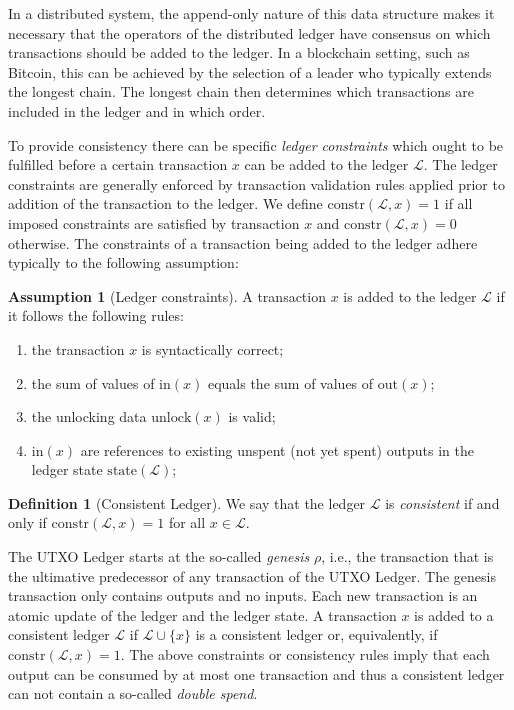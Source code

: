 \documentclass[11pt]{article}
\newcommand{\orig}{\rho}
\newcommand{\unlock}{\mathrm{unlock}}
\newcommand{\constraint}{\mathrm{constr}}
\newcommand{\state}{\mathrm{state}}
\newcommand{\true}{1}
\newcommand{\false}{0}
\newcommand{\inputs}{\mathrm{in}}
\newcommand{\outputs}{\mathrm{out}}
\newcommand{\ledger}{\mathcal{L}}
\theoremstyle{plain}
\theoremstyle{definition}
\newtheorem{definition}{Definition}
\newtheorem{ass}{Assumption}
\numberwithin{definition}{section}
\numberwithin{lemma}{section}
\numberwithin{ass}{section}
\numberwithin{remark}{section}
\numberwithin{example}{section}
\numberwithin{proposition}{section}
\numberwithin{theorem}{section}
\begin{document}
In a distributed system, the append-only nature of this data structure makes it necessary that the operators of the distributed ledger have consensus on which transactions should be added to the ledger. In a blockchain setting, such as Bitcoin, this can be achieved by the selection of a leader who typically extends the longest chain. The longest chain then determines which transactions  are included in the ledger and in which order. 

To provide consistency there can be specific \emph{ledger constraints} which ought to be fulfilled before a certain  transaction $x$ can be added to the ledger $\ledger$. The ledger constraints are generally enforced by transaction validation rules applied prior to addition of the transaction to the ledger. We define $\constraint(\ledger,x)=\true$ if all imposed constraints are satisfied by transaction $x$ and $\constraint(\ledger,x)=\false$ otherwise. 
The constraints of a transaction being added to the ledger adhere typically to the following assumption:
\begin{ass}[Ledger constraints]\label{ass:constraints}
A transaction $x$ is added to the ledger $\ledger$ if it follows the following rules:
\begin{enumerate}[leftmargin=*]
    \item the transaction $x$ is syntactically correct;
    \item the sum of values of $\inputs(x)$ equals the sum of values of $\outputs(x)$;
    \item the unlocking data $\unlock(x)$ is valid;
    \item $\inputs(x)$ are references to existing unspent (not yet spent) outputs in the ledger state  $\state(\ledger)$;
\end{enumerate}
\end{ass}

\begin{definition}[Consistent Ledger]\label{def: consistent ledger}
We say that the ledger  $\ledger$ is \emph{consistent} if and only if $\constraint(\ledger,x)=\true$ for all $x\in \ledger$.
\end{definition} 

The UTXO Ledger starts at the so-called \emph{genesis} $\orig$, i.e., the transaction that is the ultimative predecessor of any transaction of the UTXO Ledger. The genesis transaction only contains outputs and no inputs. 
Each new transaction is an atomic update of the ledger and the ledger state. A transaction $x$ is added to a consistent ledger $\ledger$ if $\ledger\cup \{x\}$ is a consistent ledger or, equivalently, if $\constraint(\ledger, x)=\true.$
The above constraints or consistency rules imply that each output can be consumed by at most one transaction and thus a consistent ledger can not contain a so-called \textit{double spend}. 
\end{document}
